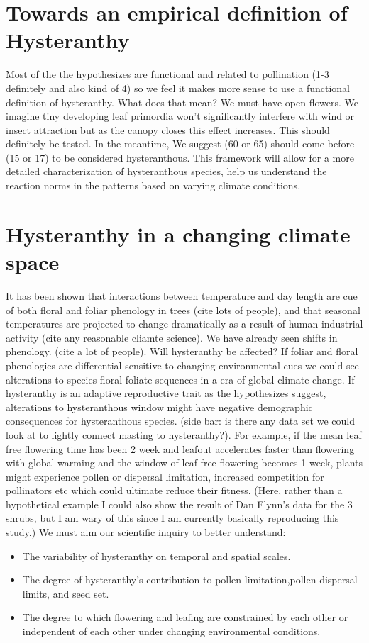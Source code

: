 \documentclass{article}\usepackage[]{graphicx}\usepackage[]{color}
\begin{document}
\section*{Towards an empirical definition of Hysteranthy}
Most of the the hypothesizes are functional and related to pollination (1-3 definitely and also kind of 4) so we feel it makes more sense to use a functional definition of hysteranthy. What does that mean? We must have open flowers. We imagine tiny developing leaf primordia won't significantly interfere with wind or insect attraction but as the canopy closes this effect increases. This should definitely be tested. In the meantime, We suggest (60 or 65) should come before (15 or 17) to be considered hysteranthous. This framework will allow for a more detailed characterization of hysteranthous species, help us understand the reaction norms in the patterns based on varying climate conditions.

\section*{Hysteranthy in a changing climate space}
It has been shown that interactions between temperature and day length are cue of both floral and foliar phenology in trees (cite lots of people), and that seasonal temperatures are projected to change dramatically as a result of human industrial activity (cite any reasonable cliamte science). We have already seen shifts in phenology. (cite a lot of people). Will hysteranthy be affected? If foliar and floral phenologies are differential sensitive to changing environmental cues we could see alterations to species floral-foliate sequences in a era of global climate change. If hysteranthy is an adaptive reproductive trait as the hypothesizes suggest, alterations to hysteranthous window might have negative demographic consequences for hysteranthous species. (side bar: is there any data set we could look at to lightly connect masting to hysteranthy?). For example, if the mean leaf free flowering time has been 2 week and leafout accelerates faster than flowering with global warming and the window of leaf free flowering becomes 1 week, plants might experience pollen or dispersal limitation, increased competition for pollinators etc which could ultimate reduce their fitness. (Here, rather than a hypothetical example I could also show the result of Dan Flynn's data for the 3 shrubs, but I am wary of this since I am currently basically reproducing this study.)
We must aim our scientific inquiry to better understand: 
\begin{itemize}
\item The variability of hysteranthy on temporal and spatial scales.
\item The degree of hysteranthy's contribution to pollen limitation,pollen dispersal limits, and seed set.
\item The degree to which flowering and leafing are constrained by each other or independent of each other under changing environmental conditions.
\end{itemize}
\end{document}
